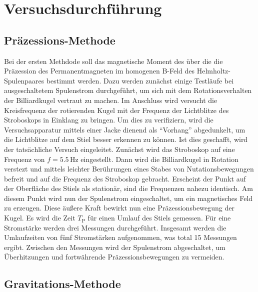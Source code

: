 \section{Versuchsdurchführung}
\subsection{Präzessions-Methode}

\noindent Bei der ersten Methdode soll das magnetische Moment des über die die Präzession des Permanentmagneten im homogenen 
B-Feld des Helmholtz-Spulenpaares bestimmt werden. Dazu werden zunächst einige Testläufe bei ausgeschaltetem Spulenstrom 
durchgeführt, um sich mit dem Rotationsverhalten der Billiardkugel vertraut zu machen. Im Anschluss wird versucht die Kreisfrequenz 
der rotierenden Kugel mit der Frequenz der Lichtblitze des Stroboskops in Einklang zu bringen. Um dies zu verifiziern, wird 
die Versuchsapparatur mittels einer Jacke dienend als \enquote{Vorhang} abgedunkelt, um die Lichtblitze auf dem Stiel besser 
erkennen zu können. Ist dies geschafft, wird der tatsächliche Versuch eingeleitet. Zunächst wird das Stroboskop auf eine 
Frequenz von $f = 5.5\,\unit{\hertz}$ eingestellt. Dann wird die Billiardkugel in Rotation verstezt und mittels leichter
Berührungen eines Stabes von Nutationsbewegungen befreit und auf die Frequenz des Stroboskop gebracht. Erscheint der Punkt auf 
der Oberfläche des Stiels als stationär, sind die Frequenzen nahezu identisch. Am diesem Punkt wird nun der Spulenstrom 
eingeschaltet, um ein magnetisches Feld zu erzeugen. Diese äußere Kraft bewirkt nun eine Präzessionsbewegung der Kugel. Es wird 
die Zeit $T_\text{P}$ für einen Umlauf des Stiels gemessen. Für eine Stromstärke werden drei Messungen durchgeführt. Insgesamt werden 
die Umlaufzeiten von fünf Stromstärken aufgenommen, was total 15 Messungen ergibt. Zwischen den Messungen wird der Spulenstrom 
abgeschaltet, um Überhitzungen und fortwährende Präzessionsbewegungen zu vermeiden.

\subsection{Gravitations-Methode}

